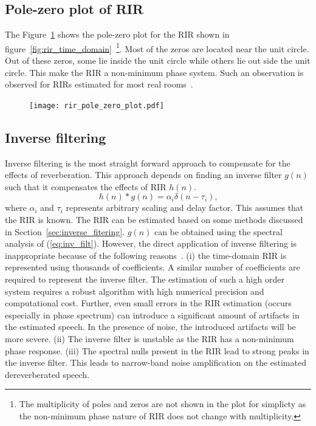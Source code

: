 \subsection{Pole-zero plot of RIR}
The Figure~\ref{fig:rir_pole_zero} shows the pole-zero plot for the RIR shown in figure~\ref{fig:rir_time_domain}~\footnote{The multiplicity of poles and zeros are not shown in the plot for simplicty as the non-minimum phase nature of RIR does not change with multiplicity.}. Most of the zeros are located near the unit circle. Out of these zeros, some lie inside the  unit circle while others lie out side the unit circle. This make the RIR a non-minimum phase system. Such an observation is observed for RIRs estimated for most real rooms~\cite{neely1979invertibility}.
\begin{figure}[ht!]
\centering
\texttt{[image: rir\_pole\_zero\_plot.pdf]}
\label{fig:rir_pole_zero}
\end{figure}

\subsection{Inverse filtering}
Inverse filtering is the most straight forward approach to compensate for the effects of reverberation. This approach depends on finding an inverse filter $g(n)$ such that it compensates the effects of RIR $h(n)$.
\begin{equation}
h(n)*g(n)=\alpha_i\delta(n-\tau_i)\text{,}
\label{eq:inv_filt}
\end{equation}
where $\alpha_i$ and $\tau_i$ represents arbitrary scaling and delay factor. This assumes that the RIR is known. The RIR can be estimated based on some methods discussed in Section~\ref{sec:inverse_fitering}. $g(n)$ can be obtained using the spectral analysis of (\ref{eq:inv_filt}). However, the direct application of inverse filtering is inappropriate because of the following reasons~\cite{naylor2010speech}. 
(i) the time-domain RIR is represented using thousands of coefficients. A similar number of coefficients are required to represent the inverse filter.  The estimation of such a high order system requires a robust algorithm with high numerical precision and computational cost. Further, even small errors in the RIR estimation (occurs especially in phase spectrum) can introduce a significant amount of artifacts in the estimated speech. In the presence of noise, the introduced artifacts will be more severe. 
(ii) The inverse filter is unstable as the RIR has a non-minimum phase response. 
(iii) The spectral nulls present in the RIR lead to strong peaks in the inverse filter. This leads to narrow-band noise amplification on the estimated dereverberated speech. 

